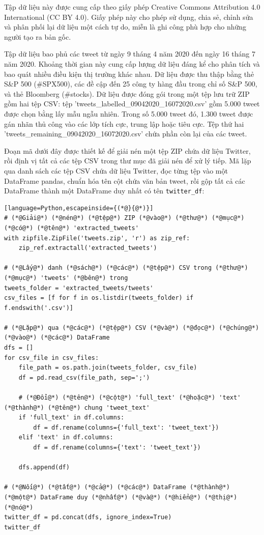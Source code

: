 Tập dữ liệu này được cung cấp theo giấy phép Creative Commons Attribution 4.0 International (CC BY 4.0). Giấy phép này cho phép sử dụng, chia sẻ, chỉnh sửa và phân phối lại dữ liệu một cách tự do, miễn là ghi công phù hợp cho những người tạo ra bản gốc.

Tập dữ liệu bao phủ các tweet từ ngày 9 tháng 4 năm 2020 đến ngày 16 tháng 7 năm 2020. Khoảng thời gian này cung cấp lượng dữ liệu đáng kể cho phân tích và bao quát nhiều điều kiện thị trường khác nhau. Dữ liệu được thu thập bằng thẻ S\&P 500 (\#SPX500), các đề cập đến 25 công ty hàng đầu trong chỉ số S\&P 500, và thẻ Bloomberg (\#stocks). Dữ liệu được đóng gói trong một tệp lưu trữ ZIP gồm hai tệp CSV: tệp 'tweets\_labelled\_09042020\_16072020.csv' gồm 5.000 tweet được chọn bằng lấy mẫu ngẫu nhiên. Trong số 5.000 tweet đó, 1.300 tweet được gán nhãn thủ công vào các lớp tích cực, trung lập hoặc tiêu cực. Tệp thứ hai 'tweets\_remaining\_09042020\_16072020.csv' chứa phần còn lại của các tweet.

Đoạn mã dưới đây được thiết kế để giải nén một tệp ZIP chứa dữ liệu Twitter, rồi định vị tất cả các tệp CSV trong thư mục đã giải nén để xử lý tiếp. Mã lặp qua danh sách các tệp CSV chứa dữ liệu Twitter, đọc từng tệp vào một DataFrame pandas, chuẩn hóa tên cột chứa văn bản tweet, rồi gộp tất cả các DataFrame thành một DataFrame duy nhất có tên \texttt{twitter\_df}:

\begin{lstlisting}[language=Python,escapeinside={(*@}{@*)}]
# (*@Giải@*) (*@nén@*) (*@tệp@*) ZIP (*@vào@*) (*@thư@*) (*@mục@*) (*@có@*) (*@tên@*) 'extracted_tweets'
with zipfile.ZipFile('tweets.zip', 'r') as zip_ref:
    zip_ref.extractall('extracted_tweets')

# (*@Lấy@*) danh (*@sách@*) (*@các@*) (*@tệp@*) CSV trong (*@thư@*) (*@mục@*) 'tweets' (*@bên@*) trong
tweets_folder = 'extracted_tweets/tweets'
csv_files = [f for f in os.listdir(tweets_folder) if f.endswith('.csv')]

# (*@Lặp@*) qua (*@các@*) (*@tệp@*) CSV (*@và@*) (*@đọc@*) (*@chúng@*) (*@vào@*) (*@các@*) DataFrame
dfs = []
for csv_file in csv_files:
    file_path = os.path.join(tweets_folder, csv_file)
    df = pd.read_csv(file_path, sep=';')

    # (*@Đổi@*) (*@tên@*) (*@cột@*) 'full_text' (*@hoặc@*) 'text' (*@thành@*) (*@tên@*) chung 'tweet_text'
    if 'full_text' in df.columns:
        df = df.rename(columns={'full_text': 'tweet_text'})
    elif 'text' in df.columns:
        df = df.rename(columns={'text': 'tweet_text'})

    dfs.append(df)

# (*@Nối@*) (*@tất@*) (*@cả@*) (*@các@*) DataFrame (*@thành@*) (*@một@*) DataFrame duy (*@nhất@*) (*@và@*) (*@hiển@*) (*@thị@*) (*@nó@*)
twitter_df = pd.concat(dfs, ignore_index=True)
twitter_df
\end{lstlisting}

